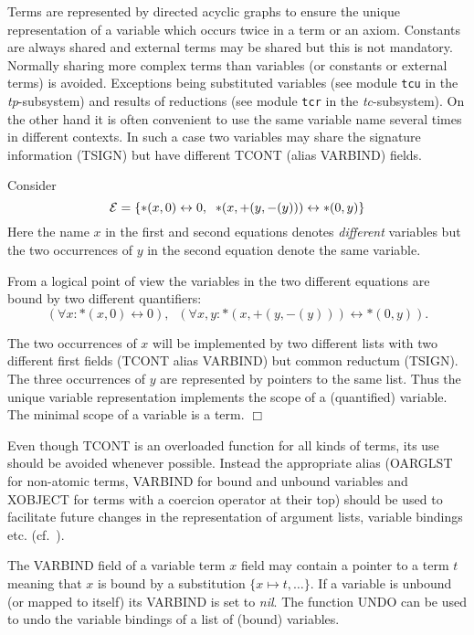 Terms are represented by directed acyclic graphs to ensure the unique
representation of a variable which occurs twice in a term or an axiom.
Constants are always shared and external terms may be shared but this is 
not mandatory.
Normally sharing more complex terms than variables (or constants 
or external terms) is avoided. 
Exceptions being substituted variables (see module {\tt tcu} in 
the {\it tp}-subsystem)
and results of reductions (see module {\tt tcr} in the {\it tc}-subsystem).
On the other hand it is often convenient to use the same variable name several 
times in different contexts.
In such a case two variables may share the signature information
(TSIGN) but have different TCONT (alias VARBIND) fields.
\begin{example} Consider
 \[ {\cal E} = \{ *(x,0) \leftrightarrow 0, \;\;
                  *(x,+(y,-(y))) \leftrightarrow *(0,y) \}
 \]
 Here the name $x$ in the first and second equations denotes {\em different}
 variables but the two occurrences of $y$ in the second equation
 denote the same variable.

 From a logical point of view the variables in the two different equations
 are bound by two different quantifiers:
 \[ (\forall x: *(x,0) \leftrightarrow 0), \;\;
    (\forall x, y: *(x,+(y,-(y))) \leftrightarrow *(0,y)).
 \]

 The two occurrences of $x$ will be implemented by two different lists
 with two different first fields (TCONT alias VARBIND) 
 but common reductum (TSIGN).
 The three occurrences of $y$ are represented by pointers to the same list.
 Thus the unique variable representation implements the scope of
 a (quantified) variable.
 The minimal scope of a variable is a term.
 \hfill $\Box$
\end{example}
Even though  TCONT is an overloaded function for all kinds of terms,
its use should be avoided whenever possible.
Instead the appropriate alias (OARGLST for non-atomic terms,
VARBIND for bound and unbound variables and XOBJECT for terms with a
coercion operator at their top) should be used to facilitate
future changes in the representation of argument lists,
variable bindings etc. (cf.\ \cite{BuendgenGoebelKuechlin:94}).

The VARBIND field of a variable term $x$ field may contain a pointer to a 
term $t$ meaning that $x$ is bound by a substitution 
$\{ x \mapsto t, \ldots\}$.
If a variable is unbound  (or  mapped to itself) its VARBIND is set 
to {\it nil}.
The function UNDO can be used to undo the variable bindings of a list
of (bound) variables.


